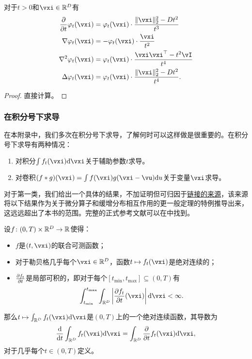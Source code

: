 \documentclass[../../book-main_zh.tex]{subfiles}
\begin{document}
\begin{proposition}\label{prop:normal_derivatives}
    对于\(t > 0\)和\(\vxi \in \R^{D}\)有
    \begin{align}
        \pdv*{\phi_{t}}{t}(\vxi)
        &= \phi_{t}(\vxi) \cdot \frac{\norm{\vxi}_{2}^{2} - Dt^{2}}{t^{3}} \\
        \nabla \phi_{t}(\vxi)
        &= -\phi_{t}(\vxi)\cdot\frac{\vxi}{t^{2}} \\ 
        \nabla^{2} \phi_{t}(\vxi)
        &= \phi_{t}(\vxi)\cdot\frac{\vxi\vxi^{\top} - t^{2}\vI}{t^{4}} \\
        \Delta \phi_{t}(\vxi)
        &= \phi_{t}(\vxi) \cdot \frac{\norm{\vxi}_{2}^{2} - Dt^{2}}{t^{4}}.
    \end{align}
\end{proposition}
\begin{proof}
    直接计算。
\end{proof}



\subsubsection{在积分号下求导}

在本附录中，我们多次在积分号下求导，了解何时可以这样做是很重要的。在积分号下求导有两种情况：
\begin{enumerate}
    \item 对积分\(\int f_{t}(\vxi)\odif{\vxi}\)关于辅助参数\(t\)求导。
    \item 对卷积\((f * g)(\vxi) = \int f(\vxi)g(\vxi - \vu)\odif{u}\)关于变量\(\vxi\)求导。
\end{enumerate}

对于第一类，我们给出一个具体的结果，不加证明但可归因于\href{https://planetmath.org/differentiationundertheintegralsign}{链接的来源}，该来源将以下结果作为关于微分算子和缓增分布相互作用的更一般定理的特例推导出来，这远远超出了本书的范围。完整的正式参考文献可以在\cite{jones1982theory}中找到。
\begin{proposition}\label{prop:dutis}
    设\(f \colon (0, T) \times \mathbb{R}^{D} \to \mathbb{R}\)使得：
    \begin{itemize}
        \item \(f\)是\((t, \vxi)\)的联合可测函数；
        \item 对于勒贝格几乎每个\(\vxi \in \R^{D}\)，函数\(t \mapsto f_{t}(\vxi)\)是绝对连续的；
        \item \(\pdv{f_{t}}{t}\)是局部可积的，即对于每个\([t_{\min}, t_{\max}] \subseteq (0, T)\)有
        \begin{equation}
            \int_{t_{\min}}^{t_{\max}}\int_{\R^{D}}\abs*{\pdv{f_{t}}{t}(\vxi)}\odif{\vxi} < \infty.
        \end{equation}
    \end{itemize}
    那么\(t \mapsto \int_{\R^{D}}f_{t}(\vxi)\odif{\vxi}\)是\((0, T)\)上的一个绝对连续函数，其导数为
    \begin{equation}
        \odv*{\int_{\R^{D}}f_{t}(\vxi)\odif{\vxi}}{t} = \int_{\R^{D}}\pdv*{f_{t}}{t}(\vxi)\odif{\vxi},
    \end{equation}
    对于几乎每个\(t \in (0, T)\)定义。
\end{proposition}
\end{document}
